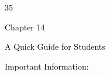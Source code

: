 \documentclass[12pt]{article}
\begin{document}
\vspace{\baselineskip}

\vspace{\baselineskip}

\vspace{\baselineskip}

\vspace{\baselineskip}

\vspace{\baselineskip}

\vspace{\baselineskip}
\begin{adjustwidth}{0.0in}{-0.07in}
\begin{Center}
\textcolor[HTML]{00000A}{35}
\end{Center}\par

\end{adjustwidth}


\vspace{\baselineskip}
{\fontsize{14pt}{16.8pt}\selectfont \textcolor[HTML]{00000A}{Chapter 14}\par}\par


\vspace{\baselineskip}
{\fontsize{20pt}{24.0pt}\selectfont \textcolor[HTML]{00000A}{A Quick Guide for Students}\par}\par


\vspace{\baselineskip}
{\fontsize{10pt}{12.0pt}\selectfont \textcolor[HTML]{00000A}{Important Information:}\par}\par
\end{document}
